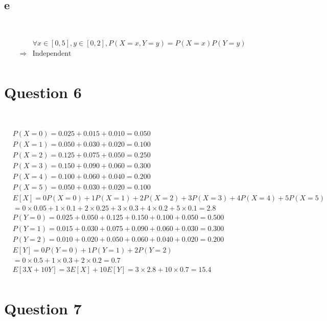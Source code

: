 \documentclass{article}
\begin{document}
~

\subsection*{e}

~

\begin{align*}
    &\forall x\in[0,5],y\in[0,2],P(X=x,Y=y)=P(X=x)P(Y=y)\\
    \Rightarrow&\text{Independent}\\
\end{align*}

\newpage

\section*{Question 6}

~

\begin{align*}
    &P(X=0)=0.025+0.015+0.010=0.050\\
    &P(X=1)=0.050+0.030+0.020=0.100\\
    &P(X=2)=0.125+0.075+0.050=0.250\\
    &P(X=3)=0.150+0.090+0.060=0.300\\
    &P(X=4)=0.100+0.060+0.040=0.200\\
    &P(X=5)=0.050+0.030+0.020=0.100\\
    &E[X]=0P(X=0)+1P(X=1)+2P(X=2)+3P(X=3)+4P(X=4)+5P(X=5)\\
    &=0\times0.05+1\times 0.1+2\times 0.25+3\times 0.3+4\times 0.2+5\times 0.1=2.8\\
    &P(Y=0)=0.025+0.050+0.125+0.150+0.100+0.050=0.500\\
    &P(Y=1)=0.015+0.030+0.075+0.090+0.060+0.030=0.300\\
    &P(Y=2)=0.010+0.020+0.050+0.060+0.040+0.020=0.200\\
    &E[Y]=0P(Y=0)+1P(Y=1)+2P(Y=2)\\
    &=0\times 0.5+1\times 0.3+2\times 0.2=0.7\\
    &E[3X+10Y]=3E[X]+10E[Y]=3\times 2.8+10\times 0.7=15.4\\
\end{align*}

\newpage

\section*{Question 7}
\end{document}
